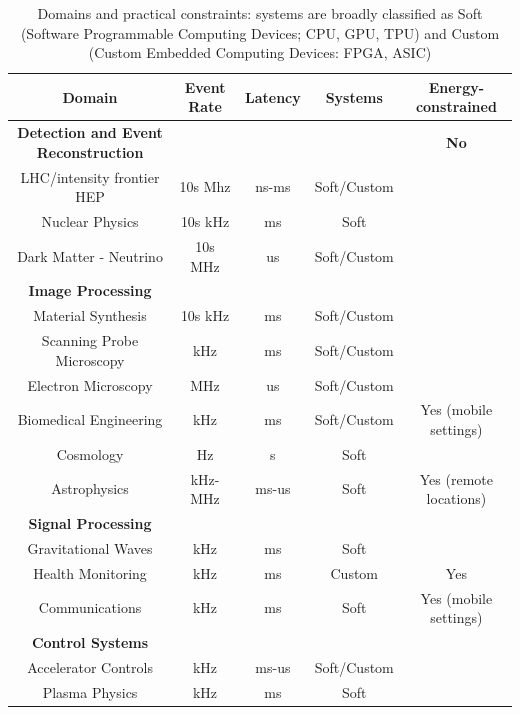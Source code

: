 \begin{table}
\centering
\caption{\label{applications}
Domains and practical constraints: systems are broadly classified as Soft (Software Programmable Computing Devices; CPU, GPU, TPU) and Custom (Custom Embedded Computing Devices: FPGA, ASIC)}
\small
\begin{tabular}{ c c c c c}
\hline
 Domain &  Event Rate & Latency & Systems &  Energy-constrained\\
 \hline
 \hline
\textbf{Detection and Event Reconstruction} &     &  &         & \textbf{No}  \\ 
LHC/intensity frontier HEP  &  10s Mhz & ns-ms & Soft/Custom        &   \\ 
Nuclear Physics &  10s kHz & ms   & Soft & \\ 
Dark Matter - Neutrino & 10s MHz & us   & Soft/Custom & \\ 
\hline
\textbf{Image Processing}    &         &          &       &   \\ 
Material Synthesis        &  10s kHz   & ms       & Soft/Custom & \\ 
Scanning Probe Microscopy &  kHz   & ms       & Soft/Custom & \\ 
Electron Microscopy       &  MHz   & us       & Soft/Custom & \\ 
Biomedical Engineering   &  kHz   & ms       & Soft/Custom & Yes (mobile settings)\\ 
Cosmology                &            Hz   & s        & Soft           &  \\ 
Astrophysics             &            kHz-MHz   & ms-us  & Soft   & Yes (remote locations)  \\ 
\hline
\textbf{Signal Processing} &           &          &     &     \\ 
Gravitational Waves        &           kHz      & ms      & Soft &  \\ 
Health Monitoring          &  kHz      & ms      & Custom & Yes \\ 
Communications             &  kHz      & ms      & Soft & Yes (mobile settings)\\
\hline
\textbf{Control Systems}   &  &  &   \\ 
Accelerator Controls       &         kHz & ms-us & Soft/Custom  \\ 
Plasma Physics             &         kHz  & ms    & Soft  
\end{tabular}
\normalsize
\end{table}




